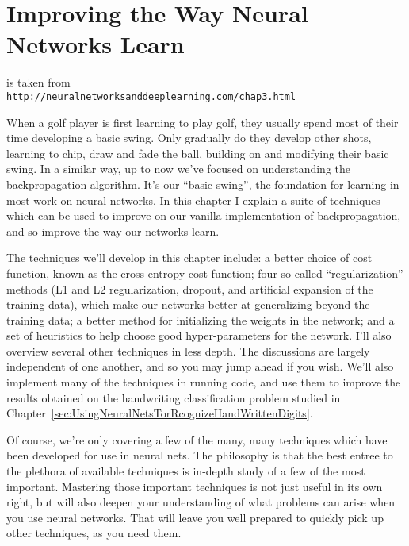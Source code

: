 
\chapter{Improving the Way Neural Networks Learn}
\label{sec:ImprovingTheWayNeuralNetworksLearn}

 is taken from\\
\lstinline{http://neuralnetworksanddeeplearning.com/chap3.html}

When a golf player is first learning to play golf, they usually spend most of their time developing a basic swing. Only gradually do they develop other shots, learning to chip, draw and fade the ball, building on and modifying their basic swing. In a similar way, up to now we've focused on understanding the backpropagation algorithm. It's our ``basic swing'', the foundation for learning in most work on neural networks. In this chapter I explain a suite of techniques which can be used to improve on our vanilla implementation of backpropagation, and so improve the way our networks learn.

The techniques we'll develop in this chapter include: a better choice of cost function, known as the cross-entropy cost function; four so-called ``regularization'' methods (L1 and L2 regularization, dropout, and artificial expansion of the training data), which make our networks better at generalizing beyond the training data; a better method for initializing the weights in the network; and a set of heuristics to help choose good hyper-parameters for the network. I'll also overview several other techniques in less depth. The discussions are largely independent of one another, and so you may jump ahead if you wish. We'll also implement many of the techniques in running code, and use them to improve the results obtained on the handwriting classification problem studied in Chapter~\ref{sec:UsingNeuralNetsTorRcognizeHandWrittenDigits}.

Of course, we're only covering a few of the many, many techniques which have been developed for use in neural nets. The philosophy is that the best entree to the plethora of available techniques is in-depth study of a few of the most important. Mastering those important techniques is not just useful in its own right, but will also deepen your understanding of what problems can arise when you use neural networks. That will leave you well prepared to quickly pick up other techniques, as you need them.


